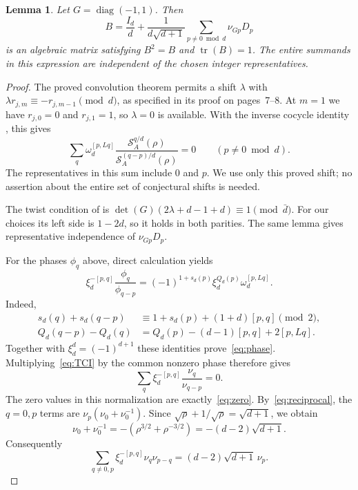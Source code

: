 \documentclass[11pt]{article}
\newtheorem{lemma}[theorem]{Lemma}
\newcommand{\tr}{\operatorname{tr}}
\newcommand{\SF}{\mathcal S}
\begin{document}
\begin{lemma}
\label{lem:ghost}
Let $G=\operatorname{diag}(-1,1)$. Then
\begin{equation}
\label{eq:B}
 B=\frac{I_d}{d}+\frac1{d\sqrt{d+1}}
     \sum_{p\ne0\bmod d}\nu_{Gp}D_p
\end{equation}
is an algebraic matrix satisfying $B^2=B$ and $\tr(B)=1$.
The entire summands in this expression are independent of the chosen
integer representatives.
\end{lemma}

\begin{proof}
The proved convolution theorem \cite[Theorem~1.2]{AFK26} permits a shift
$\lambda$ with $\lambda r_{j,m}\equiv-r_{j,m-1}\pmod d$, as specified in
its proof on pages~7--8. At $m=1$ we have $r_{j,0}=0$ and $r_{j,1}=1$,
so $\lambda=0$ is available. With the inverse cocycle identity
\cite[Lemma~2.13]{AFK25}, this gives
\begin{equation}
\label{eq:TCI}
 \sum_q\omega_d^{[p,Lq]}
 \frac{\SF_A^{q/d}(\rho)}{\SF_A^{(q-p)/d}(\rho)}=0
 \qquad(p\ne0\bmod d).
\end{equation}
The representatives in this sum include $0$ and $p$.
We use only this proved shift; no assertion about the entire set of
conjectural shifts is needed.

The twist condition of \cite[Lemma~1.42]{AFK25} is
$\det(G)(2\lambda+d-1+d)\equiv1\pmod{\bar d}$.
For our choices its left side is $1-2d$, so it holds in both parities.
The same lemma gives representative independence of $\nu_{Gp}D_p$.

For the phases $\phi_q$ above, direct calculation yields
\begin{equation}
\label{eq:phase}
 \xi_d^{-[p,q]}\frac{\phi_q}{\phi_{q-p}}
   =(-1)^{1+s_d(p)}\xi_d^{Q_d(p)}\omega_d^{[p,Lq]}.
\end{equation}
Indeed,
\begin{align*}
 s_d(q)+s_d(q-p)&\equiv1+s_d(p)+(1+d)[p,q]\pmod2,\\
 Q_d(q-p)-Q_d(q)&=Q_d(p)-(d-1)[p,q]+2[p,Lq].
\end{align*}
Together with $\xi_d^d=(-1)^{d+1}$ these identities prove~\eqref{eq:phase}.
Multiplying~\eqref{eq:TCI} by the common nonzero phase therefore gives
\begin{equation}
\label{eq:normalizedTCI}
 \sum_q\xi_d^{-[p,q]}\frac{\nu_q}{\nu_{q-p}}=0.
\end{equation}
The zero values in this normalization are exactly~\eqref{eq:zero}.
By~\eqref{eq:reciprocal}, the $q=0,p$ terms are
$\nu_p(\nu_0+\nu_0^{-1})$. Since
$\sqrt\rho+1/\sqrt\rho=\sqrt{d+1}$, we obtain
\[
 \nu_0+\nu_0^{-1}
 =-(\rho^{3/2}+\rho^{-3/2})=-(d-2)\sqrt{d+1}.
\]
Consequently
\begin{equation}
\label{eq:offzero}
 \sum_{q\ne0,p}\xi_d^{-[p,q]}\nu_q\nu_{p-q}
       =(d-2)\sqrt{d+1}\,\nu_p.
\end{equation}


\end{proof}
\end{document}
